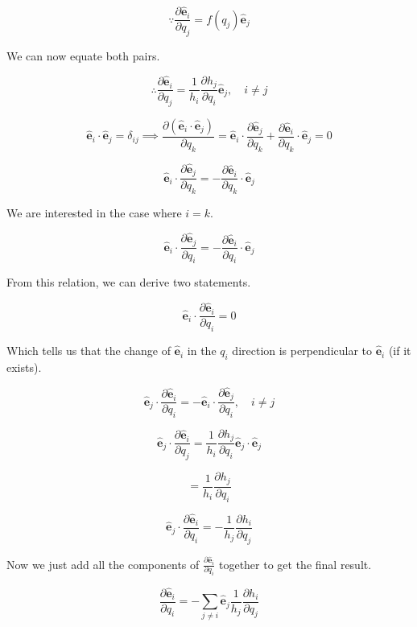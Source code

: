 \documentclass[12pt]{article}
\begin{document}
\[
    \because \frac{\partial \hat{\mathbf{e}}_i}{\partial q_j} = f\left(q_j\right)  \hat{\mathbf{e}}_j
\]

We can now equate both pairs.

\[
    \therefore\frac{\partial \hat{\mathbf{e}}_i}{\partial q_j}
    = \frac{1}{h_i} \frac{\partial h_j}{\partial q_i} \hat{\mathbf{e}}_j, \quad i \neq j
\]

\[
    \hat{\mathbf{e}}_i \cdot \hat{\mathbf{e}}_j = \delta_{ij} \implies
    \frac{\partial \left(\hat{\mathbf{e}}_i \cdot \hat{\mathbf{e}}_j\right) }{\partial q_k}
    = \hat{\mathbf{e}}_i \cdot \frac{\partial \hat{\mathbf{e}}_j}{\partial q_k}
    +  \frac{\partial \hat{\mathbf{e}}_i}{\partial q_k} \cdot \hat{\mathbf{e}}_j = 0
\]

\[
    \hat{\mathbf{e}}_i \cdot \frac{\partial \hat{\mathbf{e}}_j}{\partial q_k}
    = -\frac{\partial \hat{\mathbf{e}}_i}{\partial q_k} \cdot \hat{\mathbf{e}}_j
\]

We are interested in the case where \(i = k\).

\[
    \hat{\mathbf{e}}_i \cdot \frac{\partial \hat{\mathbf{e}}_j}{\partial q_i}
    = -\frac{\partial \hat{\mathbf{e}}_i}{\partial q_i} \cdot \hat{\mathbf{e}}_j
\]

From this relation, we can derive two statements.

\[
    \hat{\mathbf{e}}_i \cdot \frac{\partial \hat{\mathbf{e}}_i}{\partial q_i} = 0
\]

Which tells us that the change of \(\hat{\mathbf{e}}_i\) in the \(q_i\) direction is
perpendicular to \(\hat{\mathbf{e}}_i\) (if it exists).

\[
    \hat{\mathbf{e}}_j \cdot \frac{\partial \hat{\mathbf{e}}_i}{\partial q_i}
    = - \hat{\mathbf{e}}_i \cdot \frac{\partial \hat{\mathbf{e}}_j}{\partial q_i}, \quad i \neq j
\]

\[
    \hat{\mathbf{e}}_j \cdot \frac{\partial \hat{\mathbf{e}}_i}{\partial q_j}
    = \frac{1}{h_i} \frac{\partial h_j}{\partial q_i} \hat{\mathbf{e}}_j \cdot \hat{\mathbf{e}}_j
\]

\[
    = \frac{1}{h_i} \frac{\partial h_j}{\partial q_i}
\]

\[
    \hat{\mathbf{e}}_j \cdot \frac{\partial \hat{\mathbf{e}}_i}{\partial q_i}
    = - \frac{1}{h_j} \frac{\partial h_i}{\partial q_j}
\]

Now we just add all the components of \(\frac{\partial \hat{\mathbf{e}}_i}{\partial q_i}\)
together to get the final result.

\[
    \frac{\partial \hat{\mathbf{e}}_i}{\partial q_i}
    = - \sum_{j \neq i} \hat{\mathbf{e}}_j \frac{1}{h_j} \frac{\partial h_i}{\partial q_j}
\]
\end{document}
